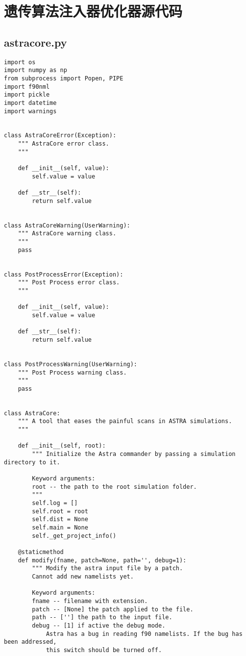\chapter{遗传算法注入器优化器源代码}
\section{astracore.py}
\begin{footnotesize}
\begin{verbatim}
import os
import numpy as np
from subprocess import Popen, PIPE
import f90nml
import pickle
import datetime
import warnings


class AstraCoreError(Exception):
    """ AstraCore error class.
    """

    def __init__(self, value):
        self.value = value

    def __str__(self):
        return self.value


class AstraCoreWarning(UserWarning):
    """ AstraCore warning class.
    """
    pass


class PostProcessError(Exception):
    """ Post Process error class.
    """

    def __init__(self, value):
        self.value = value

    def __str__(self):
        return self.value


class PostProcessWarning(UserWarning):
    """ Post Process warning class.
    """
    pass


class AstraCore:
    """ A tool that eases the painful scans in ASTRA simulations.
    """

    def __init__(self, root):
        """ Initialize the Astra commander by passing a simulation directory to it.

        Keyword arguments:
        root -- the path to the root simulation folder.
        """
        self.log = []
        self.root = root
        self.dist = None
        self.main = None
        self._get_project_info()

    @staticmethod
    def modify(fname, patch=None, path='', debug=1):
        """ Modify the astra input file by a patch.
        Cannot add new namelists yet.

        Keyword arguments:
        fname -- filename with extension.
        patch -- [None] the patch applied to the file.
        path -- [''] the path to the input file.
        debug -- [1] if active the debug mode.
            Astra has a bug in reading f90 namelists. If the bug has been addressed,
            this switch should be turned off.


\end{verbatim}
\end{footnotesize}
